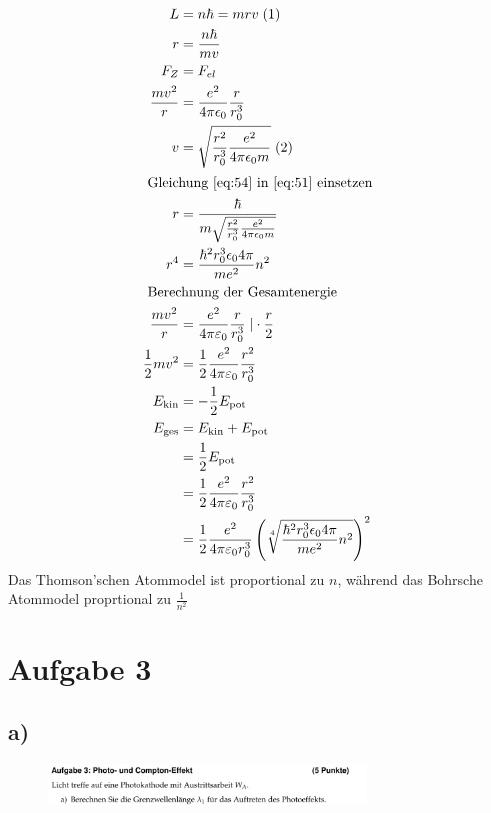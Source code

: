 \begin{align}
    L &= n \hbar = mrv \;(1)\\
    r &= \frac{n \hbar}{mv} \label{eq:51} \\
    F_Z &= F_{el}\\
    \frac{mv^2}{r} &= \frac{e^2}{4 \pi \epsilon _0} \frac{r}{r_0^3}\\
    v &= \sqrt{\frac{r^2}{r_0^3}\frac{e^2}{4 \pi \epsilon _0 m}} \;(2) \label{eq:54}\\
    \intertext{
        Gleichung \eqref{eq:54} in \eqref{eq:51} einsetzen
    }
    r &= \frac{\hbar}{m \sqrt{\frac{r^2}{r_0^3}\frac{e^2}{4 \pi \epsilon _0 m}}}\\
    r^4 &= \frac{\hbar ^2 r_0^3 \epsilon _0 4 \pi}{m e^2} n^2\\
    \intertext{
        Berechnung der Gesamtenergie
        }
    \frac{m v^2}{r} &= \frac{e^2}{4 \pi \varepsilon _0}\frac{r}{r_0^3}\;\vert \cdot \frac{r}{2}\\
    \frac{1}{2} m v^2 &= \frac{1}{2} \frac{e^2}{4 \pi \varepsilon _0} \frac{r^2}{r_0^3}\\
    E_{\text{kin}}&=-\frac{1}{2} E_{\text{pot}}\\
    E_{\text{ges}} &= E_{\text{kin}}+E_{\text{pot}}\\
    &=  \frac{1}{2} E_{\text{pot}}\\
    &= \frac{1}{2} \frac{e^2}{4 \pi \varepsilon _0} \frac{r^2}{r_0^3}\\
    &= \frac{1}{2} \frac{e^2}{4 \pi \varepsilon _0 r_0^3} \left(\sqrt[4]{\frac{\hbar ^2 r_0^3 \epsilon _0 4 \pi}{m e^2} n^2} \right)^2\\
\end{align}
Das Thomson'schen Atommodel ist proportional zu $n $, während das Bohrsche Atommodel 
proprtional zu $\frac{1}{n^2} $


\section{Aufgabe 3}

\subsection{a)}

\begin{figure}[H]
    \centering
    \includegraphics[width=0.75\textwidth]{images/Aufgabe_3a.jpg}
    \label{fig:8}
\end{figure}


